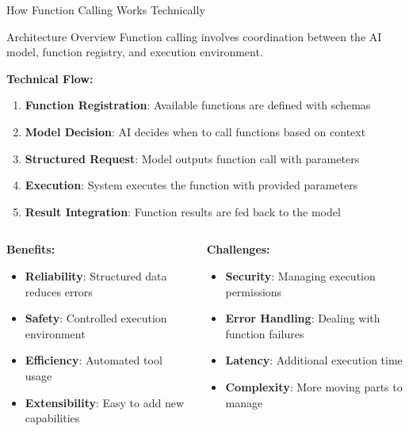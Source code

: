 \documentclass{beamer}
\begin{document}
\begin{frame}[t]{How Function Calling Works Technically}
    \begin{block}{Architecture Overview}
        Function calling involves coordination between the AI model, function registry, and execution environment.
    \end{block}
    
    \textbf{Technical Flow:}
    \begin{enumerate}
        \item \textbf{Function Registration}: Available functions are defined with schemas
        \item \textbf{Model Decision}: AI decides when to call functions based on context
        \item \textbf{Structured Request}: Model outputs function call with parameters
        \item \textbf{Execution}: System executes the function with provided parameters
        \item \textbf{Result Integration}: Function results are fed back to the model
    \end{enumerate}
    
    \begin{columns}[t]
        \begin{column}{0.5\textwidth}
            \textbf{Benefits:}
            \begin{itemize}
                \item \textbf{Reliability}: Structured data reduces errors
                \item \textbf{Safety}: Controlled execution environment
                \item \textbf{Efficiency}: Automated tool usage
                \item \textbf{Extensibility}: Easy to add new capabilities
            \end{itemize}
        \end{column}
        \begin{column}{0.5\textwidth}
            \textbf{Challenges:}
            \begin{itemize}
                \item \textbf{Security}: Managing execution permissions
                \item \textbf{Error Handling}: Dealing with function failures
                \item \textbf{Latency}: Additional execution time
                \item \textbf{Complexity}: More moving parts to manage
            \end{itemize}
        \end{column}
    \end{columns}
\end{frame}
\end{document}
